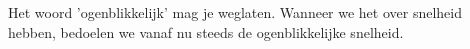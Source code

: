 \documentclass{ximera}
\begin{document}









\begin{remark}
	Het woord 'ogenblikkelijk' mag je weglaten. Wanneer we het over snelheid hebben, bedoelen we vanaf nu steeds de ogenblikkelijke snelheid.
\end{remark}
\end{document}
